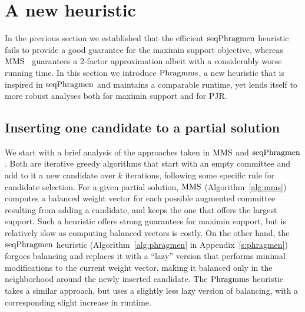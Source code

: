 \section{A new heuristic}\label{s:heuristic}

In the previous section we established that the efficient $\operatorname{seqPhragmen}$ heuristic~\cite{brill2017phragmen} fails to provide a good guarantee for the maximin support objective, whereas $\operatorname{MMS}$~\cite{sanchez2016maximin} guarantees a 2-factor approximation albeit with a considerably worse running time. 
In this section we introduce $\operatorname{Phragmms}$, a new heuristic that is inspired in $\operatorname{seqPhragmen}$ and maintains a comparable runtime, yet lends itself to more robust analyses both for maximin support and for PJR. 

\subsection{Inserting one candidate to a partial solution}

We start with a brief analysis of the approaches taken in $\operatorname{MMS}$ and $\operatorname{seqPhragmen}$. Both are iterative greedy algorithms that start with an empty committee and add to it a new candidate over $k$ iterations, following some specific rule for candidate selection.
For a given partial solution, $\operatorname{MMS}$ (Algorithm~\ref{alg:mms}) computes a balanced weight vector for each possible augmented committee resulting from adding a candidate, and keeps the one that offers the largest support. 
Such a heuristic offers strong guarantees for maximin support, but is relatively slow as computing balanced vectors is costly. 
On the other hand, the $\operatorname{seqPhragmen}$ heuristic (Algorithm~\ref{alg:phragmen} in Appendix~\ref{s:phragmen}) forgoes balancing and replaces it with a ``lazy'' version that performs minimal modifications to the current weight vector, making it balanced only in the neighborhood around the newly inserted candidate. 
The $\operatorname{Phragmms}$ heuristic takes a similar approach, but uses a slightly less lazy version of balancing, with a corresponding slight increase in runtime. 

